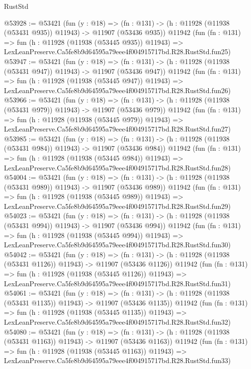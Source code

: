 \begin{lexlean}{RustStd}
\begin{coremodule}
@53928 := @53421
    (fun (y : @18) =>
    (fn : @131) -> (h : @11928 (@11938 (@53431 @935)) @11943) -> @11907 (@53436 @935))
    @11942
    (fun (fn : @131) =>
    fun (h : @11928 (@11938 (@53445 @935)) @11943) =>
    LexLeanPreserve.Ca5fe8b9d64595a79eee4f004915717bd.R28.RustStd.fun25)
@53947 := @53421
    (fun (y : @18) =>
    (fn : @131) -> (h : @11928 (@11938 (@53431 @947)) @11943) -> @11907 (@53436 @947))
    @11942
    (fun (fn : @131) =>
    fun (h : @11928 (@11938 (@53445 @947)) @11943) =>
    LexLeanPreserve.Ca5fe8b9d64595a79eee4f004915717bd.R28.RustStd.fun26)
@53966 := @53421
    (fun (y : @18) =>
    (fn : @131) -> (h : @11928 (@11938 (@53431 @979)) @11943) -> @11907 (@53436 @979))
    @11942
    (fun (fn : @131) =>
    fun (h : @11928 (@11938 (@53445 @979)) @11943) =>
    LexLeanPreserve.Ca5fe8b9d64595a79eee4f004915717bd.R28.RustStd.fun27)
@53985 := @53421
    (fun (y : @18) =>
    (fn : @131) -> (h : @11928 (@11938 (@53431 @984)) @11943) -> @11907 (@53436 @984))
    @11942
    (fun (fn : @131) =>
    fun (h : @11928 (@11938 (@53445 @984)) @11943) =>
    LexLeanPreserve.Ca5fe8b9d64595a79eee4f004915717bd.R28.RustStd.fun28)
@54004 := @53421
    (fun (y : @18) =>
    (fn : @131) -> (h : @11928 (@11938 (@53431 @989)) @11943) -> @11907 (@53436 @989))
    @11942
    (fun (fn : @131) =>
    fun (h : @11928 (@11938 (@53445 @989)) @11943) =>
    LexLeanPreserve.Ca5fe8b9d64595a79eee4f004915717bd.R28.RustStd.fun29)
@54023 := @53421
    (fun (y : @18) =>
    (fn : @131) -> (h : @11928 (@11938 (@53431 @994)) @11943) -> @11907 (@53436 @994))
    @11942
    (fun (fn : @131) =>
    fun (h : @11928 (@11938 (@53445 @994)) @11943) =>
    LexLeanPreserve.Ca5fe8b9d64595a79eee4f004915717bd.R28.RustStd.fun30)
@54042 := @53421
    (fun (y : @18) =>
    (fn : @131) -> (h : @11928 (@11938 (@53431 @1126)) @11943) -> @11907 (@53436 @1126))
    @11942
    (fun (fn : @131) =>
    fun (h : @11928 (@11938 (@53445 @1126)) @11943) =>
    LexLeanPreserve.Ca5fe8b9d64595a79eee4f004915717bd.R28.RustStd.fun31)
@54061 := @53421
    (fun (y : @18) =>
    (fn : @131) -> (h : @11928 (@11938 (@53431 @1135)) @11943) -> @11907 (@53436 @1135))
    @11942
    (fun (fn : @131) =>
    fun (h : @11928 (@11938 (@53445 @1135)) @11943) =>
    LexLeanPreserve.Ca5fe8b9d64595a79eee4f004915717bd.R28.RustStd.fun32)
@54080 := @53421
    (fun (y : @18) =>
    (fn : @131) -> (h : @11928 (@11938 (@53431 @1163)) @11943) -> @11907 (@53436 @1163))
    @11942
    (fun (fn : @131) =>
    fun (h : @11928 (@11938 (@53445 @1163)) @11943) =>
    LexLeanPreserve.Ca5fe8b9d64595a79eee4f004915717bd.R28.RustStd.fun33)

\end{coremodule}
\end{lexlean}
